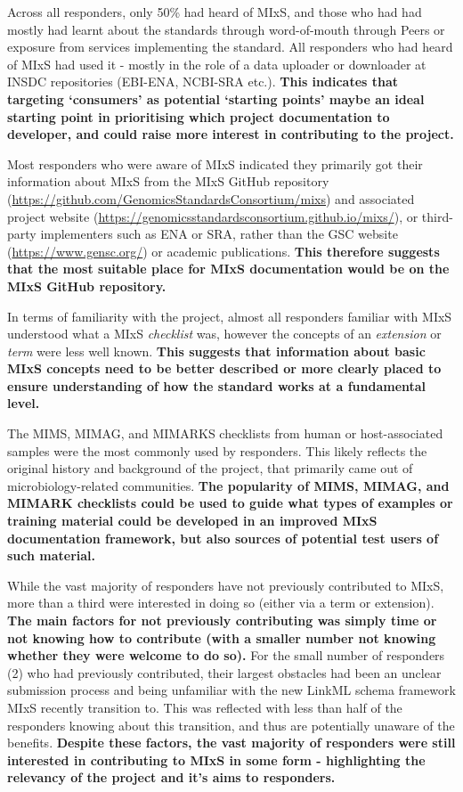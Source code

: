 \documentclass[
  letterpaper,
  DIV=11,
  numbers=noendperiod]{scrartcl}
\begin{document}
Across all responders, only 50\% had heard of MIxS, and those who had
had mostly had learnt about the standards through word-of-mouth through
Peers or exposure from services implementing the standard. All
responders who had heard of MIxS had used it - mostly in the role of a
data uploader or downloader at INSDC repositories (EBI-ENA, NCBI-SRA
etc.). \textbf{This indicates that targeting `consumers' as potential
`starting points' maybe an ideal starting point in prioritising which
project documentation to developer, and could raise more interest in
contributing to the project.}

Most responders who were aware of MIxS indicated they primarily got
their information about MIxS from the MIxS GitHub repository
(\url{https://github.com/GenomicsStandardsConsortium/mixs}) and
associated project website
(\url{https://genomicsstandardsconsortium.github.io/mixs/}), or
third-party implementers such as ENA or SRA, rather than the GSC website
(\href{https://genomicsstandardsconsortium.github.io/mixs/}{https://www.gensc.org/})
or academic publications. \textbf{This therefore suggests that the most
suitable place for MIxS documentation would be on the MIxS GitHub
repository.}

In terms of familiarity with the project, almost all responders familiar
with MIxS understood what a MIxS \emph{checklist} was, however the
concepts of an \emph{extension} or \emph{term} were less well known.
\textbf{This suggests that information about basic MIxS concepts need to
be better described or more clearly placed to ensure understanding of
how the standard works at a fundamental level.}

The MIMS, MIMAG, and MIMARKS checklists from human or host-associated
samples were the most commonly used by responders. This likely reflects
the original history and background of the project, that primarily came
out of microbiology-related communities. \textbf{The popularity of MIMS,
MIMAG, and MIMARK checklists could be used to guide what types of
examples or training material could be developed in an improved MIxS
documentation framework, but also sources of potential test users of
such material.}

While the vast majority of responders have not previously contributed to
MIxS, more than a third were interested in doing so (either via a term
or extension). \textbf{The main factors for not previously contributing
was simply time or not knowing how to contribute (with a smaller number
not knowing whether they were welcome to do so).} For the small number
of responders (2) who had previously contributed, their largest
obstacles had been an unclear submission process and being unfamiliar
with the new LinkML schema framework MIxS recently transition to. This
was reflected with less than half of the responders knowing about this
transition, and thus are potentially unaware of the benefits.
\textbf{Despite these factors, the vast majority of responders were
still interested in contributing to MIxS in some form - highlighting the
relevancy of the project and it's aims to responders.}
\end{document}
